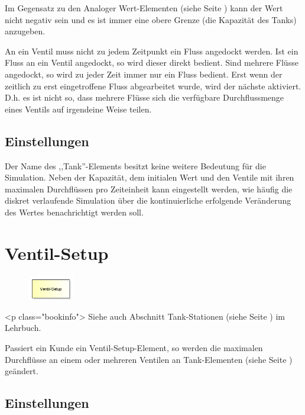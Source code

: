Im Gegensatz zu den Analoger Wert-Elementen (siehe Seite \pageref{ref:ModelElementAnalogValue}) 
kann der Wert nicht negativ sein und es ist immer eine obere Grenze (die Kapazität des Tanks)
anzugeben.

An ein Ventil muss nicht zu jedem Zeitpunkt ein Fluss angedockt werden.
Ist ein Fluss an ein Ventil angedockt, so wird dieser direkt bedient.
Sind mehrere Flüsse angedockt, so wird zu jeder Zeit immer nur ein Fluss bedient.
Erst wenn der zeitlich zu erst eingetroffene Fluss abgearbeitet wurde, wird der nächste
aktiviert. D.h. es ist nicht so, dass mehrere Flüsse sich die verfügbare Durchflussmenge
eines Ventils auf irgendeine Weise teilen.

\subsection*{Einstellungen}

Der Name des ,,Tank''-Elements besitzt keine weitere Bedeutung für die Simulation.
Neben der Kapazität, dem initialen Wert und den Ventile mit ihren maximalen Durchflüssen
pro Zeiteinheit kann eingestellt werden, wie häufig die diskret verlaufende Simulation über die kontinuierliche
erfolgende Veränderung des Wertes benachrichtigt werden soll.


\section{Ventil-Setup}
\label{ref:ModelElementTankValveSetup}

\begin{figure}
\vspace{-22pt}
\includegraphics[width=2cm]{imageModelElementTankValveSetup.png}
\vspace{-22pt}
\end{figure}

<p class="bookinfo">
Siehe auch Abschnitt Tank-Stationen (siehe Seite \pageref{ref:book:8.8.2}) im Lehrbuch.

Passiert ein Kunde ein Ventil-Setup-Element, so werden die maximalen Durchflüsse an einem
oder mehreren Ventilen an Tank-Elementen (siehe Seite \pageref{ref:ModelElementTank}) geändert.

\subsection*{Einstellungen}


